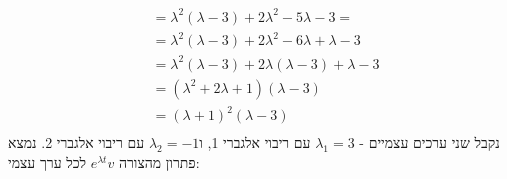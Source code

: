 \documentclass{article}
\begin{document}
\begin{align*}
                   & = \lambda^2(\lambda-3)+2\lambda^2-5\lambda-3 =                                                                        \\
                   & = \lambda^2(\lambda-3)+2\lambda^2-6\lambda+\lambda-3                                                                  \\
                   & = \lambda^2(\lambda-3)+2\lambda(\lambda-3)+\lambda-3                                                                  \\
                   & = (\lambda^2+2\lambda+1)(\lambda-3)                                                                                   \\
                   & = (\lambda+1)^2(\lambda-3)                                                                                            \\
\end{align*}
נקבל שני ערכים עצמיים - $\lambda_1=3$ עם ריבוי אלגברי 1, ו$\lambda_2=-1$ עם ריבוי אלגברי 2.
נמצא פתרון מהצורה $e^{\lambda t}v$ לכל ערך עצמי:
\end{document}

